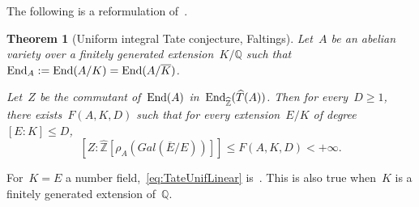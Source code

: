 \documentclass[12pt]{amsart}
\newtheorem{theorem}{Theorem}[section]
\newcommand{\End}{{\rm End}}
\newcommand{\Gal}{{\rm Gal}}
\newcommand{\F}{{\mathbb F}}
\newcommand{\Z}{{\mathbb Z}}
\newcommand{\Q}{{\mathbb Q}}
\renewcommand{\Gal}{{\operatorname{Gal}}}
\newcommand{\ol}{\overline}
\newcommand{\wh}{\widehat}
\newcommand{\tens}{\otimes}
\begin{document}
The following is a reformulation of~\cite[Definition 2.1]{RY:IHES}.
\begin{theorem}[Uniform integral Tate conjecture, Faltings]\label{thm:uniform Faltings}
Let~$A$  be an abelian variety over a finitely generated extension~$K/\Q$ such that~$\End_A:=\End(A/K)=\End(A/\ol{K})$.

Let~$Z$ be the commutant of~$\End(A)$ in~$\End_{\wh{\Z}}(\wh{T}(A))$. Then for every~$D\geq 1$, there exists~$F(A,K,D)$ such that for every extension~$E/K$ of degree~$[E:K]\leq D$,
\begin{equation}\label{eq:TateUnifLinear}
\left[Z:\wh{\Z}\left[\rho_A(Gal(\ol{E}/E))\right]\right]\leq F(A,K,D)<+\infty.
\end{equation}
\end{theorem}
For~$K=E$ a number field,~\eqref{eq:TateUnifLinear} is~\cite[Théorème 2.7]{Deligne}.
This is also true when~$K$ is a finitely generated extension of~$\Q$.
\end{document}
